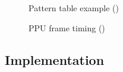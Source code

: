 \documentclass[]{report}
\begin{document}
 \begin{figure}[!htb]
 	\caption{\label{fig:my-label} Pattern table example (\cite{PTRN})}
 	\caption{\label{fig:my-label} PPU frame timing (\cite{PTRN})}
 \end{figure}
 \clearpage

\subsection{Implementation}
\end{document}
